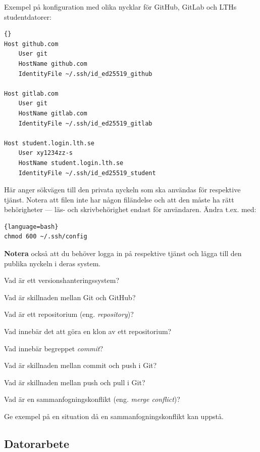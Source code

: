 \begin{itemize}[nosep]
          Exempel på konfiguration med olika nycklar för GitHub, GitLab och LTHs studentdatorer:
\begin{lstlisting}{}
Host github.com
    User git
    HostName github.com
    IdentityFile ~/.ssh/id_ed25519_github

Host gitlab.com
    User git
    HostName gitlab.com
    IdentityFile ~/.ssh/id_ed25519_gitlab

Host student.login.lth.se
    User xy1234zz-s
    HostName student.login.lth.se
    IdentityFile ~/.ssh/id_ed25519_student
\end{lstlisting}

          Här anger  sökvägen till den privata nyckeln som ska användas för respektive tjänst. Notera att filen  inte har någon filändelse och att den måste ha rätt behörigheter --- läs- och skrivbehörighet endast för användaren. Ändra t.ex. med:
\begin{lstlisting}{language=bash}
chmod 600 ~/.ssh/config
\end{lstlisting}

          \textbf{Notera} också att du behöver logga in på respektive tjänst och lägga till den publika nyckeln i deras system.

\end{itemize}


\begin{Kontrollfragor}
\item Vad är ett versionshanteringssystem?
\item Vad är skillnaden mellan Git och GitHub?
\item Vad är ett repositorium (eng. \emph{repository})?
\item Vad innebär det att göra en klon av ett repositorium?
\item Vad innebär begreppet \emph{commit}?
\item Vad är skillnaden mellan commit och push i Git?
\item Vad är skillnaden mellan push och pull i Git?
\item Vad är en sammanfogningskonflikt (eng. \emph{merge conflict})?
\item Ge exempel på en situation då en sammanfogningskonflikt kan uppstå.
\end{Kontrollfragor} 

\subsection{Datorarbete}

